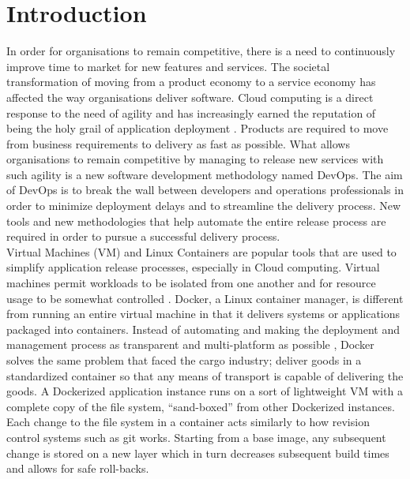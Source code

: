 \chapter{Introduction}
In order for organisations to remain competitive, there is a need to continuously improve time to market for new features and services. The societal transformation of moving from a product economy to a service economy has affected the way organisations deliver software. Cloud computing is a direct response to the need of agility and has increasingly earned the reputation of being the holy grail of application deployment \cite{7034713}. Products are required to move from business requirements to delivery as fast as possible. What allows organisations to remain competitive by managing to release new services with such agility is a new software development methodology named DevOps. The aim of DevOps is to break the wall between developers and operations professionals in order to minimize deployment delays and to streamline the delivery process. New tools and new methodologies that help automate the entire release process are required in order to pursue a successful delivery process.\\

Virtual Machines (VM) and Linux Containers are popular tools that are used to simplify application release processes, especially in Cloud computing. Virtual machines permit workloads to be isolated from one another and for resource usage to be somewhat controlled \cite{7095802}. Docker, a Linux container manager, is different from running an entire virtual machine in that it delivers systems or applications packaged into containers. Instead of automating and making the deployment and management process as transparent and multi-platform as possible \cite{7095802}, Docker solves the same problem that faced the cargo industry; deliver goods in a standardized container so that any means of transport is capable of delivering the goods. A Dockerized application instance runs on a sort of lightweight VM with a complete copy of the file system, “sand-boxed” from other Dockerized instances. Each change to the file system in a container acts similarly to how revision control systems such as git works. Starting from a base image, any subsequent change is stored on a new layer which in turn decreases subsequent build times and allows for safe roll-backs.\\

